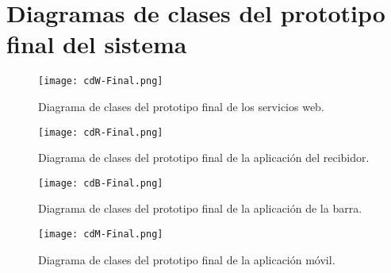 \chapter{Diagramas de clases del prototipo final del sistema}
\label{chap:classDiagrams}

  \begin{sidewaysfigure}[h]
    \begin{center}
      \texttt{[image: cdW-Final.png]}
      \caption{Diagrama de clases del prototipo final de los servicios web.}
      \label{fig:cdW-Final}
    \end{center}
  \end{sidewaysfigure}

  \begin{sidewaysfigure}[h]
    \begin{center}
      \texttt{[image: cdR-Final.png]}
      \caption{Diagrama de clases del prototipo final de la aplicación del
      recibidor.}
      \label{fig:cdR-Final}
    \end{center}
  \end{sidewaysfigure}

  \begin{sidewaysfigure}[h]
    \begin{center}
      \texttt{[image: cdB-Final.png]}
      \caption{Diagrama de clases del prototipo final de la aplicación de la
      barra.}
      \label{fig:cdB-Final}
    \end{center}
  \end{sidewaysfigure}

  \begin{sidewaysfigure}[h]
    \begin{center}
      \texttt{[image: cdM-Final.png]}
      \caption{Diagrama de clases del prototipo final de la aplicación móvil.}
      \label{fig:cdM-Final}
    \end{center}
  \end{sidewaysfigure}

